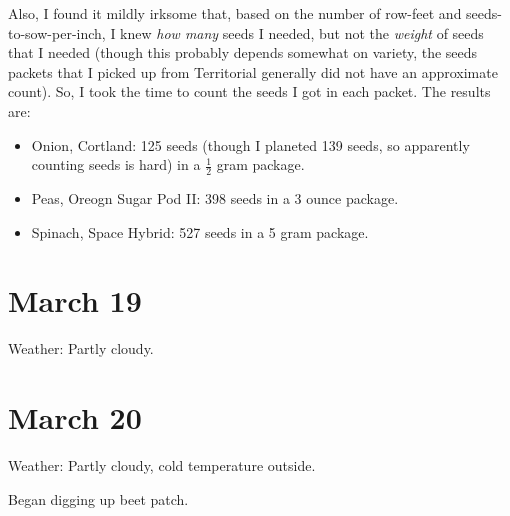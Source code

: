 \documentclass{article}
\begin{document}
Also, I found it mildly irksome that, based on the number of row-feet and seeds-to-sow-per-inch, I knew \textit{how many} seeds I needed, but not the \textit{weight} of seeds that I needed (though this probably depends somewhat on variety, the seeds packets that I picked up from Territorial generally did not have an approximate count). So, I took the time to count the seeds I got in each packet. The results are:
\begin{itemize}
	\item Onion, Cortland: 125 seeds (though I planeted 139 seeds, so apparently counting seeds is hard) in a $\frac{1}{2}$ gram package.
	\item Peas, Oreogn Sugar Pod II: 398 seeds in a 3 ounce package.
	\item Spinach, Space Hybrid: 527 seeds in a 5 gram package.
\end{itemize}

\section*{March 19}
Weather: Partly cloudy.

\section*{March 20}
Weather: Partly cloudy, cold temperature outside.

Began digging up beet patch.
\end{document}
